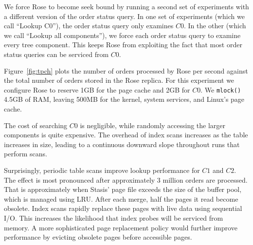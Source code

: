 \documentclass{vldb}
\newcommand{\rows}{Rose\xspace}
\newcommand{\rowss}{Rose's\xspace}
\begin{document}
We force \rows to become seek bound by running a second set of
experiments with a different version of the order status query.  In one set
of experiments (which we call ``Lookup C0''), the order status query
only examines $C0$.  In the other (which we call ``Lookup all
components''), we force each order status query to examine every tree
component.  This keeps \rows from exploiting the fact that most order
status queries can be serviced from $C0$.


Figure~\ref{fig:tpch} plots the number of orders processed by \rows
per second against the total number of orders stored in the \rows
replica.  For this experiment we configure \rows to reserve 1GB for
the page cache and 2GB for $C0$.  We {\tt mlock()} 4.5GB of RAM, leaving
500MB for the kernel, system services, and Linux's page cache.


The cost of searching $C0$ is negligible, while randomly
accessing the larger components is quite expensive.  The overhead of
index scans increases as the table increases in size, leading to a
continuous downward slope throughout runs that perform scans.

Surprisingly, periodic table scans improve lookup
performance for $C1$ and $C2$.  The effect is most pronounced after
approximately 3 million orders are processed.  That is approximately
when Stasis' page file exceeds the size of the buffer pool, which is
managed using LRU.  After each merge, half the pages it read
become obsolete.  Index scans rapidly replace these pages with live
data using sequential I/O.  This increases the likelihood that index
probes will be serviced from memory.  A more sophisticated page
replacement policy would further improve performance by evicting
obsolete pages before accessible pages.
\end{document}
